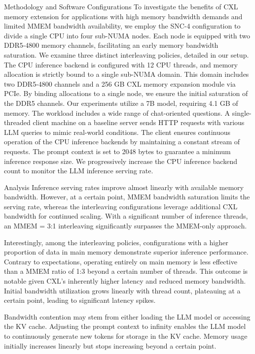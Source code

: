 Methodology and Software Configurations
To investigate the benefits of CXL memory extension for applications with high memory bandwidth demands and limited MMEM bandwidth availability, we employ the SNC-4 configuration to divide a single CPU into four sub-NUMA nodes. Each node is equipped with two DDR5-4800 memory channels, facilitating an early memory bandwidth saturation. We examine three distinct interleaving policies, detailed in our setup. The CPU inference backend is configured with 12 CPU threads, and memory allocation is strictly bound to a single sub-NUMA domain. This domain includes two DDR5-4800 channels and a 256 GB CXL memory expansion module via PCIe. By binding allocations to a single node, we ensure the initial saturation of the DDR5 channels. Our experiments utilize a 7B model, requiring 4.1 GB of memory. The workload includes a wide range of chat-oriented questions. A single-threaded client machine on a baseline server sends HTTP requests with various LLM queries to mimic real-world conditions. The client ensures continuous operation of the CPU inference backends by maintaining a constant stream of requests. The prompt context is set to 2048 bytes to guarantee a minimum inference response size. We progressively increase the CPU inference backend count to monitor the LLM inference serving rate.

Analysis
Inference serving rates improve almost linearly with available memory bandwidth. However, at a certain point, MMEM bandwidth saturation limits the serving rate, whereas the interleaving configurations leverage additional CXL bandwidth for continued scaling. With a significant number of inference threads, an MMEM
= 3:1 interleaving significantly surpasses the MMEM-only approach.

Interestingly, among the interleaving policies, configurations with a higher proportion of data in main memory demonstrate superior inference performance. Contrary to expectations, operating entirely on main memory is less effective than a MMEM
ratio of 1:3 beyond a certain number of threads. This outcome is notable given CXL's inherently higher latency and reduced memory bandwidth. Initial bandwidth utilization grows linearly with thread count, plateauing at a certain point, leading to significant latency spikes.

Bandwidth contention may stem from either loading the LLM model or accessing the KV cache. Adjusting the prompt context to infinity enables the LLM model to continuously generate new tokens for storage in the KV cache. Memory usage initially increases linearly but stops increasing beyond a certain point.

